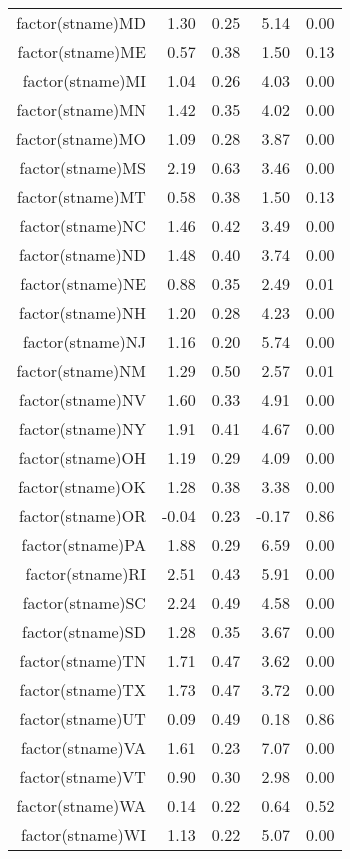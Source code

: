 \begin{table}[ht]
\begin{tabular}{rrrrr}
  factor(stname)MD & 1.30 & 0.25 & 5.14 & 0.00 \\ 
  factor(stname)ME & 0.57 & 0.38 & 1.50 & 0.13 \\ 
  factor(stname)MI & 1.04 & 0.26 & 4.03 & 0.00 \\ 
  factor(stname)MN & 1.42 & 0.35 & 4.02 & 0.00 \\ 
  factor(stname)MO & 1.09 & 0.28 & 3.87 & 0.00 \\ 
  factor(stname)MS & 2.19 & 0.63 & 3.46 & 0.00 \\ 
  factor(stname)MT & 0.58 & 0.38 & 1.50 & 0.13 \\ 
  factor(stname)NC & 1.46 & 0.42 & 3.49 & 0.00 \\ 
  factor(stname)ND & 1.48 & 0.40 & 3.74 & 0.00 \\ 
  factor(stname)NE & 0.88 & 0.35 & 2.49 & 0.01 \\ 
  factor(stname)NH & 1.20 & 0.28 & 4.23 & 0.00 \\ 
  factor(stname)NJ & 1.16 & 0.20 & 5.74 & 0.00 \\ 
  factor(stname)NM & 1.29 & 0.50 & 2.57 & 0.01 \\ 
  factor(stname)NV & 1.60 & 0.33 & 4.91 & 0.00 \\ 
  factor(stname)NY & 1.91 & 0.41 & 4.67 & 0.00 \\ 
  factor(stname)OH & 1.19 & 0.29 & 4.09 & 0.00 \\ 
  factor(stname)OK & 1.28 & 0.38 & 3.38 & 0.00 \\ 
  factor(stname)OR & -0.04 & 0.23 & -0.17 & 0.86 \\ 
  factor(stname)PA & 1.88 & 0.29 & 6.59 & 0.00 \\ 
  factor(stname)RI & 2.51 & 0.43 & 5.91 & 0.00 \\ 
  factor(stname)SC & 2.24 & 0.49 & 4.58 & 0.00 \\ 
  factor(stname)SD & 1.28 & 0.35 & 3.67 & 0.00 \\ 
  factor(stname)TN & 1.71 & 0.47 & 3.62 & 0.00 \\ 
  factor(stname)TX & 1.73 & 0.47 & 3.72 & 0.00 \\ 
  factor(stname)UT & 0.09 & 0.49 & 0.18 & 0.86 \\ 
  factor(stname)VA & 1.61 & 0.23 & 7.07 & 0.00 \\ 
  factor(stname)VT & 0.90 & 0.30 & 2.98 & 0.00 \\ 
  factor(stname)WA & 0.14 & 0.22 & 0.64 & 0.52 \\ 
  factor(stname)WI & 1.13 & 0.22 & 5.07 & 0.00 \\ 

\end{tabular}
\end{table}
